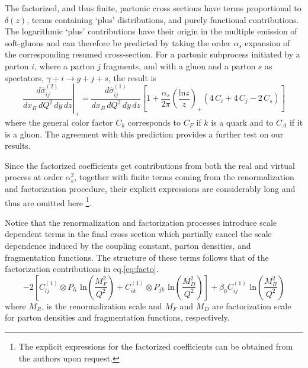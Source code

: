 \documentclass[superscriptaddress,showkeys,showpacs]{revtex4}
\begin{document}
The factorized, and thus finite, partonic cross sections have
terms proportional to $\delta(z)$, terms containing `plus' distributions,
and purely functional contributions. The logarithmic `plus' contributions have 
their origin in the multiple emission of soft-gluons and can therefore be predicted 
by taking the order $\alpha_s$ expansion of the corresponding resumed cross-section. 
For a partonic subprocess initiated by a parton $i$, 
where a parton $j$ fragments, and with a gluon and a parton $s$ as spectators, 
$\gamma+i\rightarrow g+j+s$, the result is
\begin{equation}
\left.\frac{d\hat{\sigma}^{(2)}_{ij}}{dx_B\,dQ^2\,dy\,dz}\right|_+=
\frac{d\hat{\sigma}^{(1)}_{ij}}{dx_B\,dQ^2\,dy\,dz} 
\left[1+\frac{\alpha_s}{2\pi}\left( \frac{\mbox{ln}z}{z}\right)_+ 
\left(4\,C_i+4\, C_j-2\,C_s \right)\right]
\end{equation}
where the general color factor $C_k$ corresponds to $C_F$ if $k$ is a quark and to 
$C_A$ if it 
is a gluon. The agreement with this prediction provides a further test on our 
results. 

Since the factorized coefficients get contributions from both the real and 
virtual process at order $\alpha_s^2$, together with finite terms coming from
the renormalization and factorization procedure, their explicit expressions
are considerably long and thus are omitted here \footnote{The explicit 
expressions for the factorized 
coefficients can be obtained from the authors upon request.}.

Notice that the renormalization and factorization processes introduce scale 
dependent terms in the final cross section which partially cancel the scale
dependence induced by the coupling constant, parton densities, and 
fragmentation functions. The structure of 
these terms follows that of the factorization contributions in 
eq.\eqref{eq:facto}. 
 \begin{equation}
-2\left[C_{lj}^{(1)}\otimes P_{li}\, \,\mbox{ln}\left(\frac{M_F^2}{Q^2} \right)+
C_{ik}^{(1)}\otimes P_{jk}\, \, \mbox{ln}\left(\frac{M_D^2}{Q^2} \right)\right]+
\beta_0 C_{ij}^{(1)}\,\, \mbox{ln}\left(\frac{M_R^2}{Q^2} \right)
\end{equation}
where  $M_R$, is the renormalization scale and  $M_F$ and $M_D$ are factorization 
scale for parton densities and fragmentation functions, respectively. 
\end{document}
